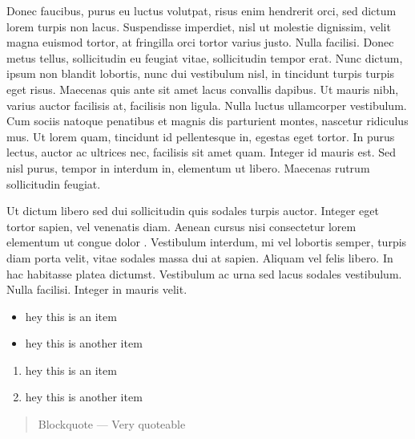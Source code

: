 Donec faucibus, purus eu luctus volutpat, risus enim hendrerit orci, sed
dictum lorem turpis non lacus. Suspendisse imperdiet, nisl ut molestie
dignissim, velit magna euismod tortor, at fringilla orci tortor varius
justo. Nulla facilisi. Donec metus tellus, sollicitudin eu feugiat
vitae, sollicitudin tempor erat. Nunc dictum, ipsum non blandit
lobortis, nunc dui vestibulum nisl, in tincidunt turpis turpis eget
risus. Maecenas quis ante sit amet lacus convallis dapibus. Ut mauris
nibh, varius auctor facilisis at, facilisis non ligula. Nulla luctus
ullamcorper vestibulum. Cum sociis natoque penatibus et magnis dis
parturient montes, nascetur ridiculus mus. Ut lorem quam, tincidunt id
pellentesque in, egestas eget tortor. In purus lectus, auctor ac
ultrices nec, facilisis sit amet quam. Integer id mauris est. Sed nisl
purus, tempor in interdum in, elementum ut libero. Maecenas rutrum
sollicitudin feugiat.

Ut dictum libero sed dui sollicitudin quis sodales turpis auctor.
Integer eget tortor sapien, vel venenatis diam. Aenean cursus nisi
consectetur lorem elementum ut congue dolor . Vestibulum interdum, mi
vel lobortis semper, turpis diam porta velit, vitae sodales massa dui at
sapien. Aliquam vel felis libero. In hac habitasse platea dictumst.
Vestibulum ac urna sed lacus sodales vestibulum. Nulla facilisi. Integer
in mauris velit.

\begin{itemize}
\item
  hey this is an item
\item
  hey this is another item
\end{itemize}
\begin{enumerate}
\item
  hey this is an item
\item
  hey this is another item
\end{enumerate}
\begin{quote}
Blockquote --- Very quoteable

\end{quote}
